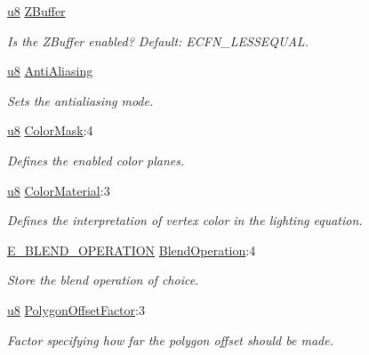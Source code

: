 \begin{DoxyCompactItemize}
\hyperlink{namespaceirr_a646874f69af8ff87fc10201b0254a761}{u8} \hyperlink{classirr_1_1video_1_1SMaterial_a7e604773b2ac61ab7a15ec9afef0dabf}{Z\+Buffer}
\begin{DoxyCompactList}\small\item\em Is the Z\+Buffer enabled? Default\+: E\+C\+F\+N\+\_\+\+L\+E\+S\+S\+E\+Q\+U\+AL. \end{DoxyCompactList}\item 
\hyperlink{namespaceirr_a646874f69af8ff87fc10201b0254a761}{u8} \hyperlink{classirr_1_1video_1_1SMaterial_a8f42b43ebf214c502e6758b9b608c095}{Anti\+Aliasing}
\begin{DoxyCompactList}\small\item\em Sets the antialiasing mode. \end{DoxyCompactList}\item 
\hyperlink{namespaceirr_a646874f69af8ff87fc10201b0254a761}{u8} \hyperlink{classirr_1_1video_1_1SMaterial_a5a4833b515b453c592224d89356dbc01}{Color\+Mask}\+:4
\begin{DoxyCompactList}\small\item\em Defines the enabled color planes. \end{DoxyCompactList}\item 
\hyperlink{namespaceirr_a646874f69af8ff87fc10201b0254a761}{u8} \hyperlink{classirr_1_1video_1_1SMaterial_a127d0d7a428cb9e5450f2e448b7652ae}{Color\+Material}\+:3
\begin{DoxyCompactList}\small\item\em Defines the interpretation of vertex color in the lighting equation. \end{DoxyCompactList}\item 
\hyperlink{namespaceirr_1_1video_a6d78c1faed23a03e8ef7b7b623bbaf2f}{E\+\_\+\+B\+L\+E\+N\+D\+\_\+\+O\+P\+E\+R\+A\+T\+I\+ON} \hyperlink{classirr_1_1video_1_1SMaterial_afbef5b333fd3af57649cf11ab575fa26}{Blend\+Operation}\+:4
\begin{DoxyCompactList}\small\item\em Store the blend operation of choice. \end{DoxyCompactList}\item 
\hyperlink{namespaceirr_a646874f69af8ff87fc10201b0254a761}{u8} \hyperlink{classirr_1_1video_1_1SMaterial_afa24a258ca0ca5eff3b66a3f8aa04462}{Polygon\+Offset\+Factor}\+:3
\begin{DoxyCompactList}\small\item\em Factor specifying how far the polygon offset should be made. \end{DoxyCompactList}\item 

\end{DoxyCompactItemize}

